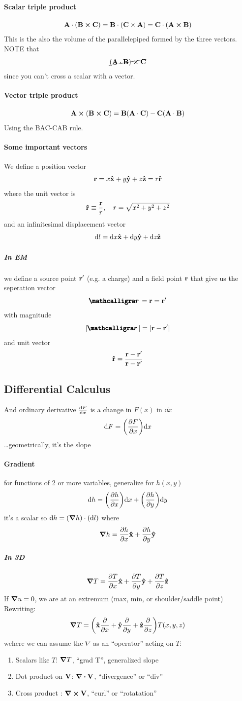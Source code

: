 \documentclass[../main.tex]{subfiles}
\begin{document}
\paragraph*{Scalar triple product}
\[\vb A \cdot (\vb B \cross \vb C) = \vb B \cdot (\vb C \times \vb A) = \vb C \cdot (\vb A \cross \vb B)\]
This is the also the volume of the parallelepiped formed by the three vectors. NOTE that
\[\cancel{(\vb A \cdot \vb B) \cross \vb C}\]
since you can't cross a scalar with a vector.

\paragraph*{Vector triple product}
\[\vb A \cross (\vb B \cross \vb C) = \vb B(\vb A \cdot \vb C) - \vb C(\vb A \cdot \vb B)\]
Using the BAC-CAB rule. 

\paragraph*{Some important vectors}
We define a position vector 
\[\vb r = x \vu x + y \vu y + z \vu z = r \vu r\]
where the unit vector is
\[\vu r \equiv \frac{\vb r}{r}, \quad r = \sqrt{x^2 + y^2 + z^2}\]
and an infinitesimal displacement vector
\[\dd{l} = \dd x \vu x + \dd y \vu y + \dd z \vu z\]

\subparagraph*{In EM}
we define a source point $\vb r'$ (e.g. a charge) and a field point $\vb r$ that give us the seperation vector
\[\boldscriptr = \vb r = \vb r'\]
with magnitude
\[\abs{\boldscriptr} = \abs{\vb r - \vb r'}\]
and unit vector
\[\vu r = \frac{\vb r - \vb r'}{\vb r - \vb r'}\]

\subsection{Differential Calculus}

And ordinary derivative $\dv{F}{x}$ is a change in $F(x)$ in $\dd x$
\[\dd F = \qt(\pdv{F}{x})\dd x\]
\dots geometrically, it's the slope

\paragraph*{Gradient}
for functions of 2 or more variables, generalize for $h(x,y)$
\[\dd h = \qt(\pdv{h}{x}) \dd x + \qt(\pdv{h}{y}) \dd y\]
it's a scalar so \(\dd h = (\grad h) \cdot (\dd l)\) where
\[\grad h = \pdv{h}{x} \vu x + \pdv{h}{y} \vu y \]

\subparagraph*{In 3D}
\[\grad T = \pdv{T}{x} \vu x + \pdv{T}{y} \vu y + \pdv{T}{z} \vu z\]
If $\grad u = 0$, we are at an extremum (max, min, or shoulder/saddle point)
Rewriting:
\[\grad T = \qt(\vu x \pdv{x} + \vu y \pdv{y} + \vu z \pdv{z}) T(x,y,z)\]
wehere we can assume the $\nabla$ as an ``operator'' acting on $T$:
\begin{enumerate}
    \item Scalars like $T$: $\grad T$, ``grad T'', generalized slope
    \item Dot product on $\vb V$: $\div \vb V$, ``divergence'' or ``div''
    \item Cross product : $\curl \vb V$, ``curl'' or ``rotatation''
\end{enumerate}
\end{document}
